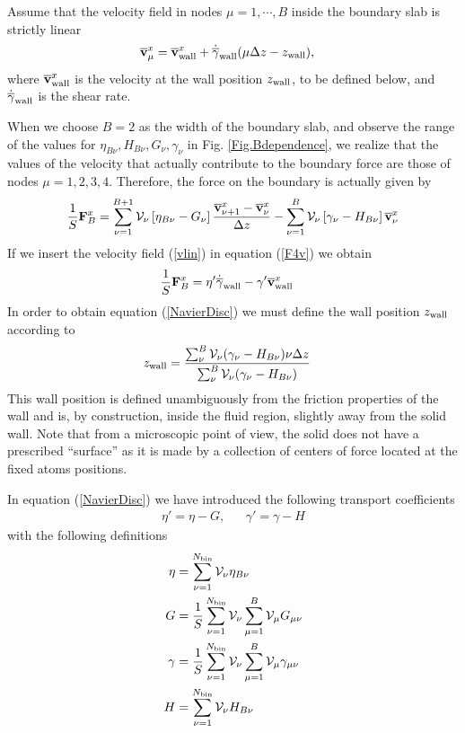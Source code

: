 \documentclass[b5paper,openright,10pt]{book}
\begin{document}
Assume that  the velocity field  in nodes $\mu=1,\cdots,B$  inside the
boundary slab is strictly linear
\begin{align}
\overline{\bf v}^x_{\mu}&=  \overline{\bf v}^x_{\rm wall}+\dot{\overline{\gamma}}_{\rm wall}(\mu\Delta z-z_{\rm wall}),
\label{vlin}
\end{align}
where  $\overline{\bf v}^x_{\rm  wall}$ is  the velocity  at the  wall
position    $z_{\rm    wall}$,    to    be    defined    below,    and
$\dot{\overline{\gamma}}_{\rm wall}$ is the  shear rate.  

When we  choose $B=2$ as the  width of the boundary  slab, and observe
the  range   of  the  values  for   $\eta_{B\nu}, H_{B\nu},G_\nu,\gamma_\nu$  in
Fig. \ref{Fig.Bdependence}, we realize that the values of the velocity
that actually contribute to the boundary force are those of nodes $\mu=1,2,3,4$.
Therefore, the force on the boundary is actually given  by
\begin{align}
\frac{1}{S}{\bf F}^x_B=  \sum_{\nu=1}^{B+1} {\cal V}_\nu 
\left[\eta_{B\nu}-G_\nu \right]\frac{\overline{\bf v}^x_{\nu+1}-\overline{\bf v}^x_{\nu}}{\Delta z}
-\sum_{\nu=1}^{B} {\cal V}_\nu\left[\gamma_{\nu}-H_{B\nu}\right]\overline{\bf v}^x_\nu
\label{F4v}
\end{align}
If we insert
the velocity field (\ref{vlin}) in equation (\ref{F4v}) we obtain
\begin{align}
\frac{1}{S}{\bf F}^x_B&=\eta'\dot{\overline{\gamma}}_{\rm wall}
-\gamma'\overline{\bf v}^x_{\rm wall}
\label{NavierDisc}
\end{align}
In order  to obtain equation   (\ref{NavierDisc}) we must define  the wall
position $z_{\rm wall}$ according to
\begin{align}
  z_{\rm wall}&=\frac{\sum_\nu^{B}{\cal V}_\nu(\gamma_\nu-H_{B \nu})\nu\Delta z}
{\sum_\nu^{B}{\cal V}_\nu(\gamma_\nu-H_{B \nu}) }
\label{zwallDisc}
\end{align}
This  wall   position  is  defined  unambiguously   from  the  friction
properties  of the  wall and  is,  by construction,  inside the  fluid
region,  slightly  away  from  the   solid  wall.  Note  that  from  a
microscopic  point of  view,  the  solid does  not  have a  prescribed
``surface'' as it is made by  a collection of centers of force located
at the fixed atoms positions.


In equation (\ref{NavierDisc}) we have introduced the following transport coefficients
\begin{align}
  \eta'=   \eta - G, &&
\gamma'=  \gamma-H
\end{align}
with the following definitions \begin{align}
  \eta&= \sum^{N_{\rm bin}}_{\nu=1} {\cal V}_\nu \eta_{B\nu}
\nonumber\\
G &=  \frac{1}{S} \sum^{N_{\rm bin}}_{\nu=1} {\cal V}_\nu \sum^{B}_{\mu=1}{\cal V}_\mu G_{\mu\nu}
\nonumber\\
\gamma&=  \frac{1}{S}\sum^{N_{\rm bin}}_{\nu=1}{\cal V}_\nu\sum^{B}_{\mu=1}{\cal V}_\mu \gamma_{\mu\nu}
\nonumber\\
H&= \sum^{N_{\rm bin}}_{\nu=1} {\cal V}_\nu H_{B\nu}
\label{etagamma2}
\end{align}
\end{document}
